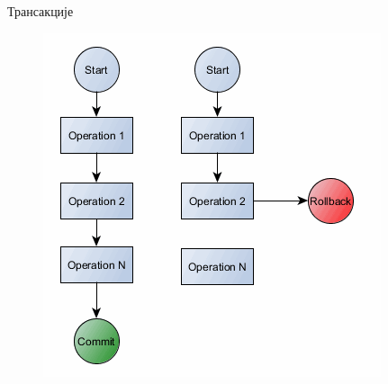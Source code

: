 \documentclass{beamer}
\begin{document}
\begin{frame}[allowframebreaks]{Трансакције}
        \begin{figure}
            \centering
            \includegraphics[width=\textwidth,height=0.8\textheight,keepaspectratio]{images/transaction.png}
            \label{fig:transaction}
        \end{figure}
    \end{frame}
    
\end{document}
